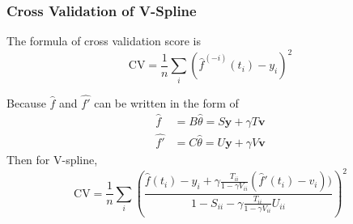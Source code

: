 \documentclass{beamer}
\begin{document}
\begin{frame}
\frametitle{Cross Validation of V-Spline}

The formula of cross validation score is 
\begin{equation}
\mbox{CV}=\frac{1}{n}\sum_i (\hat{f}^{(-i)}(t_i)-y_i)^2
\end{equation}

Because $\hat{f}$ and $\hat{f'}$ can be written in the form of
\begin{equation}\label{linearformofF}
\begin{split}
\hat{f} &=B\hat{\theta}=S\mathbf{y}+\gamma T\mathbf{v}\\
\hat{f'}&=C\hat{\theta}=U\mathbf{y}+\gamma V\mathbf{v}
\end{split}
\end{equation}
Then for V-spline, 
\begin{equation}
\mbox{CV}=\frac{1}{n}\sum_i \left(\frac{\hat{f}(t_i)-y_i+\gamma \frac{T_{ii}}{1-\gamma V_{ii}}(\hat{f}'(t_i)-v_i)) }{1-S_{ii}-\gamma \frac{T_{ii}}{1-\gamma V_{ii}}U_{ii}}\right)^2
\end{equation}
\end{frame}


\end{document}
